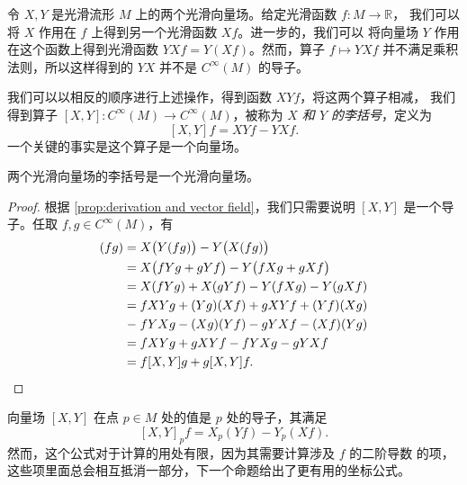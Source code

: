\documentclass[fontset=none]{Notes}
\begin{document}
令 $X,Y$ 是光滑流形 $M$ 上的两个光滑向量场。给定光滑函数 $f:M\to \mathbb{R}$，
我们可以将 $X$ 作用在 $f$ 上得到另一个光滑函数 $Xf$。进一步的，我们可以
将向量场 $Y$ 作用在这个函数上得到光滑函数 $YXf=Y(Xf)$。然而，算子 $f\mapsto YXf$
并不满足乘积法则，所以这样得到的 $YX$ 并不是 $C^\infty(M)$ 的导子。

我们可以以相反的顺序进行上述操作，得到函数 $XYf$，将这两个算子相减，
我们得到算子 $[X,Y]:C^\infty(M)\to C^\infty(M)$，被称为
\emph{$X$ 和 $Y$ 的李括号}，定义为
\[
  [X,Y]f=XYf-YXf.  
\]
一个关键的事实是这个算子是一个向量场。

\begin{lemma}
  两个光滑向量场的李括号是一个光滑向量场。
\end{lemma}
\begin{proof}
  \allowdisplaybreaks
  根据 \autoref{prop:derivation and vector field}，我们只需要说明
  $[X,Y]$ 是一个导子。任取 $f,g\in C^\infty(M)$，有
  \begin{align*}
    [X,Y](fg)&=X\bigl(Y(fg)\bigr)-Y\bigl(X(fg)\bigr)\\
    &=X\bigl(fYg+gYf\bigr)-Y\bigl(fXg+gXf\bigr)\\
    &=X(fYg)+X(gYf)-Y(fXg)-Y(gXf)\\
    &=fXYg+(Yg)(Xf)+gXYf+(Yf)(Xg)\\
    &\mathrel{-}fYXg-(Xg)(Yf)-gYXf-(Xf)(Yg)\\
    &=fXYg+gXYf-fYXg-gYXf\\
    &=f[X,Y]g+g[X,Y]f.\qedhere
  \end{align*}
\end{proof}

向量场 $[X,Y]$ 在点 $p\in M$ 处的值是 $p$ 处的导子，其满足
\[
  [X,Y]_pf=X_p(Yf)-Y_p(Xf).  
\]
然而，这个公式对于计算的用处有限，因为其需要计算涉及 $f$ 的二阶导数
的项，这些项里面总会相互抵消一部分，下一个命题给出了更有用的坐标公式。
\end{document}
